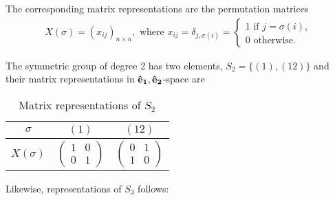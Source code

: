 		The corresponding matrix representations are the permutation matrices
		\begin{align}
			X(\sigma) = (x_{ij})_{n \times n}, \text{ where } x_{ij} = \delta_{j,\sigma(i)} = \begin{cases}
				1 \text{ if } j = \sigma(i),\\
				0 \text{ otherwise.}
			\end{cases}
		\end{align}
		
		\begin{example}[$S_n$ for $n = 2,3$]
			
			The symmetric group of degree 2 has two elements, $S_2 = \{(1), (12)\}$ and their matrix representations in $\mathbf{\mathbf{\hat{e}}_1},\mathbf{\mathbf{\hat{e}}_2}$-space are
			\begin{table}[hbt!]
				\centering
				\caption{Matrix representations of $S_2$}
				\begin{tabular}{c | c c}
					$\sigma$    & $(1)$ & $(12)$ \\
					\hline
					$X(\sigma)$ & $\begin{pmatrix}
						1 & 0 \\ 0 & 1
					\end{pmatrix}$ & $\begin{pmatrix}
					0 & 1 \\ 1 & 0
					\end{pmatrix}$
				\end{tabular}
			\end{table}
			
			Likewise, representations of $S_3$ follows:
			

\end{example}
